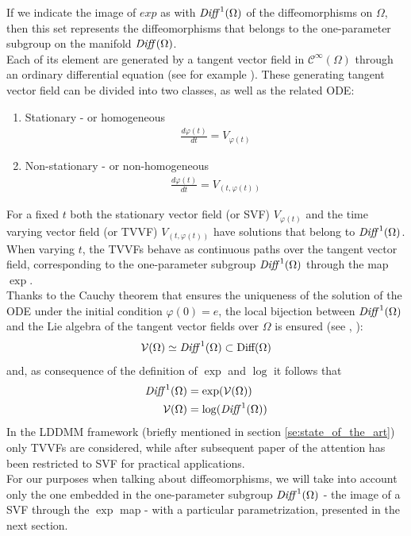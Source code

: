 If we indicate the image of $exp$ as with $\text{\emph{Diff}}^{1}(\Omega)$ of the diffeomorphisms on $\Omega$, then this set represents the diffeomorphisms that belongs to the one-parameter subgroup on the manifold $\text{\emph{Diff}}(\Omega)$.\\
Each of its element are generated by a tangent vector field in $\mathcal{C}^{\infty}(\Omega)$ through an ordinary differential equation (see for example \cite{arnold2006ordinary}). These generating tangent vector field can be divided into two classes, as well as the related ODE:
\begin{enumerate}
	\item Stationary  - or homogeneous
	\begin{align*}
	\frac{d\varphi(t)}{dt} = V_{\varphi(t)}
	\end{align*}
	\item Non-stationary - or non-homogeneous
	\begin{align*}
	\frac{d\varphi(t)}{dt} = V_{(t, \varphi(t))}
	\end{align*}
\end{enumerate}
For a fixed $t$ both the stationary vector field (or SVF) $V_{\varphi(t)}$ and the time varying vector field (or TVVF) $V_{(t, \varphi(t))}$ have solutions that belong to $\text{\emph{Diff}}^{1}(\Omega)$. When varying $t$, the TVVFs behave as continuous paths over the tangent vector field, corresponding to the one-parameter subgroup $\text{\emph{Diff}}^{1}(\Omega)$ through the map $\exp$.\\
Thanks to the Cauchy theorem that ensures the uniqueness of the solution of the ODE under the initial condition $\varphi(0) = e$, the local bijection between $\text{\emph{Diff}}^{1}(\Omega)$ and the Lie algebra of the tangent vector fields over $\Omega$ is ensured (see \cite{milnor1982infinite}, \cite{khesin2008geometry}):
\begin{align*}
\mathcal{V}(\Omega) \simeq  \text{\emph{Diff}}^{1}(\Omega) \subset \text{Diff}(\Omega)
\end{align*}
and, as consequence of the definition of $\exp$ and $\log$ it follows that
\begin{align*}
\text{\emph{Diff}}^{1}(\Omega) &= \exp( \mathcal{V}(\Omega))\\
\mathcal{V}(\Omega) &= \log(\text{\emph{Diff}}^{1}(\Omega))
\end{align*}
In the LDDMM framework (briefly mentioned in section \ref{se:state_of_the_art}) only TVVFs are considered, while after subsequent paper of \cite{arsigny2006log} the attention has been restricted to SVF for practical applications.\\
For our purposes when talking about diffeomorphisms, we will take into account only the one embedded in the one-parameter subgroup $\text{\emph{Diff}}^{1}(\Omega)$ - the image of a SVF through the $\exp$ map - with a particular parametrization, presented in the next section. 

